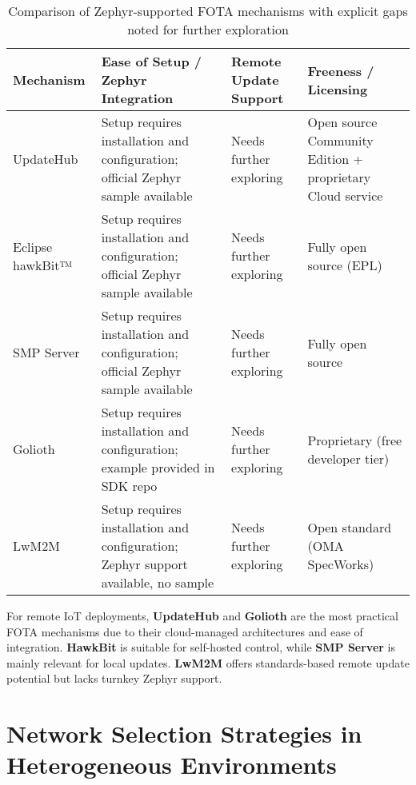 \begin{table}[H]
\centering
\renewcommand{\arraystretch}{1.2}
\begin{tabular}{@{}>{\raggedright\arraybackslash}p{}
                  >{\raggedright\arraybackslash}p{}
                  >{\raggedright\arraybackslash}p{}
                  >{\raggedright\arraybackslash}p{}@{}}
\hline
\textbf{Mechanism} & \textbf{Ease of Setup / Zephyr Integration} & \textbf{Remote Update Support} & \textbf{Freeness / Licensing} \\
\hline
UpdateHub & Setup requires installation and configuration; official Zephyr sample available & Needs further exploring & Open source Community Edition + proprietary Cloud service \\
\hline
Eclipse hawkBit™ & Setup requires installation and configuration; official Zephyr sample available & Needs further exploring & Fully open source (EPL) \\
\hline
SMP Server & Setup requires installation and configuration; official Zephyr sample available & Needs further exploring & Fully open source \\
\hline
Golioth & Setup requires installation and configuration; example provided in SDK repo & Needs further exploring & Proprietary (free developer tier) \\
\hline
LwM2M & Setup requires installation and configuration; Zephyr support available, no sample & Needs further exploring & Open standard (OMA SpecWorks) \\
\hline
\end{tabular}
\caption{Comparison of Zephyr-supported FOTA mechanisms with explicit gaps noted for further exploration}
\label{tab:fota_comparison}
\end{table}


For remote IoT deployments, \textbf{UpdateHub} and \textbf{Golioth} are the most practical FOTA mechanisms due to their cloud-managed architectures and ease of integration. \textbf{HawkBit} is suitable for self-hosted control, while \textbf{SMP Server} is mainly relevant for local updates. \textbf{LwM2M} offers standards-based remote update potential but lacks turnkey Zephyr support.

\section{Network Selection Strategies in Heterogeneous Environments}

